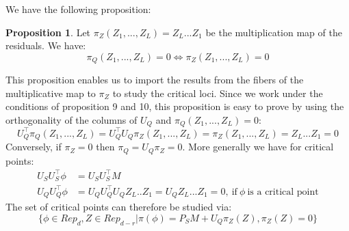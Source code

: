 \documentclass{article}
\theoremstyle{definition}
\newtheorem{proposition}[theorem]{Proposition}
\begin{document}
We have the following proposition:
\begin{proposition}
    Let $\pi_Z(Z_1,...,Z_L) = Z_L...Z_1$ be the multiplication map of the residuals. We have:
    $$ \pi_Q(Z_1,...,Z_L)=0 \iff \pi_Z(Z_1,...,Z_L) = 0$$  
\end{proposition}
This proposition enables us to import the results from the fibers of the multiplicative map to $\pi_Z$ to study the critical loci. Since we work under the conditions of proposition 9 and 10, this proposition is easy to prove by using the orthogonality of the columns of $U_Q$ and $\pi_Q(Z_1,...,Z_L)=0$:
\begin{equation*}
    U_Q^{\top}\pi_Q(Z_1,...,Z_L) = U_Q^{\top}U_Q\pi_Z(Z_1,...,Z_L) = \pi_Z(Z_1,...,Z_L) = Z_L...Z_1 = 0
\end{equation*}
Conversely, if $\pi_Z = 0$ then $\pi_Q = U_Q\pi_Z = 0$.
More generally we have for critical points:
\begin{align*}
    U_SU_S^{\top}\phi & = U_SU_S^{\top}M\\
    U_QU_Q^{\top}\phi & = U_QU_Q^{\top}U_QZ_L..Z_1 = U_QZ_L...Z_1 = 0, \ \text{if} \ \phi \ \text{is a critical point}
\end{align*}
The set of critical points can therefore be studied via:
\begin{equation*}
    \{\phi \in Rep_d, Z\in Rep_{d-r}| \pi(\phi) = P_SM + U_Q\pi_Z(Z), \pi_Z(Z) =0 \}
\end{equation*}
\end{document}
